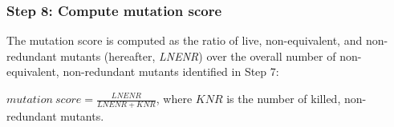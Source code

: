 

\subsubsection{Step 8: Compute mutation score}
\label{sec:appr:score}

The mutation score is computed as the ratio of live, non-equivalent, and non-redundant mutants (hereafter, \emph{LNENR}) over the overall number of non-equivalent, non-redundant mutants identified in Step 7:

$\mathit{mutation}\ \mathit{score} = \frac{\mathit{LNENR}}{\mathit{LNENR}+\mathit{KNR}}$,
where $\mathit{KNR}$ is the number of killed, non-redundant mutants.

%
%
%
